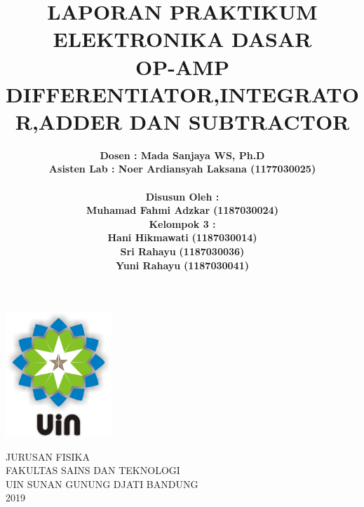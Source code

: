 \documentclass[12pt,a4paper]{article}
\begin{document}
\onehalfspacing
\begin{titlepage}

\title{\textbf{LAPORAN PRAKTIKUM ELEKTRONIKA DASAR
\\ OP-AMP DIFFERENTIATOR,INTEGRATOR,ADDER DAN SUBTRACTOR}}  %
\author{\textbf {Dosen : Mada Sanjaya WS, Ph.D  }
\\ \textbf{Asisten Lab : Noer Ardiansyah Laksana (1177030025)}
\\ \textbf{ }
\\ \textbf{Disusun Oleh :}
\\ \textbf{Muhamad Fahmi Adzkar} \textbf {(1187030024)}
\\ \textbf{Kelompok 3 :}
\\ \textbf{Hani Hikmawati} \textbf {(1187030014)}
\\ \textbf{Sri Rahayu} \textbf {(1187030036)}
\\ \textbf{Yuni Rahayu} \textbf {(1187030041)}}

\maketitle
\begin{center}
\vspace{1cm}
\includegraphics[width=4cm]{uin.png}
\vspace{1cm}

JURUSAN FISIKA\\
FAKULTAS SAINS DAN TEKNOLOGI\\
UIN SUNAN GUNUNG DJATI BANDUNG\\
2019\\
\end{center}
\end{titlepage}
\end{document}
